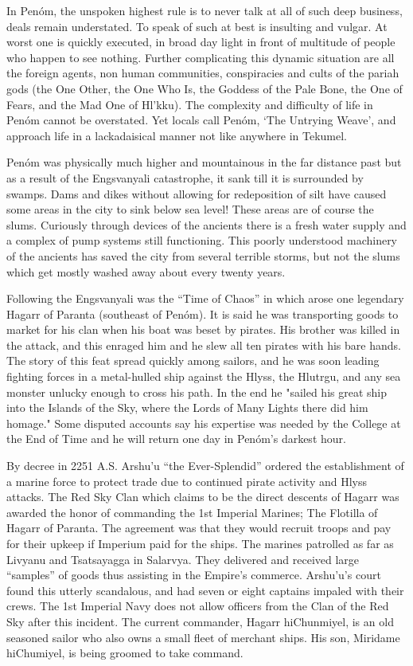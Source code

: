 In Penóm, the unspoken highest rule is to never talk at all of such deep business, deals remain understated. To speak of such at best is insulting and vulgar. At worst one is quickly executed, in broad day light in front of multitude of people who happen to see nothing. Further complicating this dynamic situation are all the foreign agents, non human communities, conspiracies and cults of the pariah gods (the One Other, the One Who Is, the Goddess of the Pale Bone, the One of Fears, and the Mad One of Hl'kku). The complexity and difficulty of life in Penóm cannot be overstated. Yet locals call Penóm, `The Untrying Weave', and approach life in a lackadaisical manner not like anywhere in Tekumel.

Penóm was physically much higher and mountainous in the far distance past but as a result of the Engsvanyali catastrophe, it sank till it is surrounded by swamps. Dams and dikes without allowing for redeposition of silt have caused some areas in the city to sink below sea level! These areas are of course the slums. Curiously through devices of the ancients there is a fresh water supply and a complex of pump systems still functioning. This poorly understood machinery of the ancients has saved the city from several terrible storms, but not the slums which get mostly washed away about every twenty years.

Following the Engsvanyali was the ``Time of Chaos'' in which arose one legendary Hagarr of Paranta (southeast of Penóm). It is said he was transporting goods to market for his clan when his boat was beset by pirates. His brother was killed in the attack, and this enraged him and he slew all ten pirates with his bare hands. The story of this feat spread quickly among sailors, and he was soon leading fighting forces in a metal-hulled ship against the Hlyss, the Hlutrgu, and any sea monster unlucky enough to cross his path. In the end he "sailed his great ship into the Islands of the Sky, where the Lords of Many Lights there did him homage." Some disputed accounts say his expertise was needed by the College at the End of Time and he will return one day in Penóm's darkest hour.

By decree in 2251 A.S. Arshu'u ``the Ever-Splendid'' ordered the establishment of a marine force to protect trade due to continued pirate activity and Hlyss attacks. The Red Sky Clan which claims to be the direct descents of Hagarr was awarded the honor of commanding the 1st Imperial Marines; The Flotilla of Hagarr of Paranta. The agreement was that they would recruit troops and pay for their upkeep if Imperium paid for the ships. The marines patrolled as far as Livyanu and Tsatsayagga in Salarvya. They delivered and received large ``samples'' of goods thus assisting in the Empire's commerce. Arshu'u's court found this utterly scandalous, and had seven or eight captains impaled with their crews. The 1st Imperial Navy does not allow officers from the Clan of the Red Sky after this incident. The current commander, Hagarr hiChunmiyel, is an old seasoned sailor who also owns a small fleet of merchant ships. His son, Miridame hiChumiyel, is being groomed to take command.

